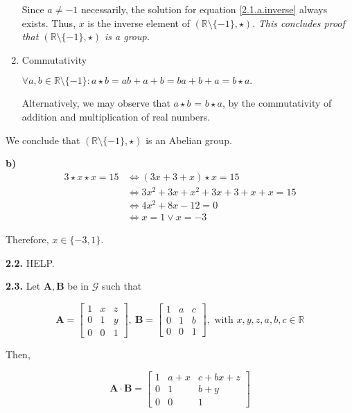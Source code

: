 \documentclass{article}
\def\ma{{\bm{A}}}
\def\mb{{\bm{B}}}
\def\R{{\mathbb{R}}}
\begin{document}
\begin{enumerate}
    Since $a \neq -1$ necessarily, the solution for equation \ref{2.1.a.inverse} always exists. Thus, $x$ is the inverse element of $(\R \setminus \{-1\}, \star)$. \textit{This concludes proof that $(\R \setminus \{-1\}, \star)$ is a group.}
    
    \item Commutativity
    
    $\forall a, b \in \R \setminus \{-1\}: a \star b = ab + a + b = ba + b + a = b \star a.$
    
    Alternatively, we may observe that $a \star b$ = $b \star a$, by the commutativity of addition and multiplication of real numbers.
\end{enumerate}

We conclude that $(\R \setminus \{-1\}, \star)$ is an Abelian group.

\textbf{b)} \begin{equation}
    \begin{split}
        3 \star x \star x = 15 & \iff (3x + 3 + x) \star x = 15 \\
        & \iff 3x^2 + 3x + x^2 + 3x + 3 + x + x = 15 \\
        & \iff 4x^2 + 8x - 12 = 0 \\
        & \iff x = 1 \vee x = -3
    \end{split}
\end{equation}

Therefore, $x \in \{-3, 1\}$.

\textbf{2.2.} HELP.

\textbf{2.3.} Let $\ma, \mb$ be in $\mathcal{G}$ such that

\[
\ma = \begin{bmatrix}
    1 & x & z\\
    0 & 1 & y\\
    0 & 0 & 1
\end{bmatrix},\ 
\mb = \begin{bmatrix}
    1 & a & c\\
    0 & 1 & b\\
    0 & 0 & 1
\end{bmatrix},\text{ with } x, y, z, a, b, c \in \R
\]

Then,

\[
\ma \cdot \mb = \begin{bmatrix}
    1 & a + x & c + bx + z\\
    0 & 1 & b + y\\
    0 & 0 & 1
\end{bmatrix}
\]
\end{document}
